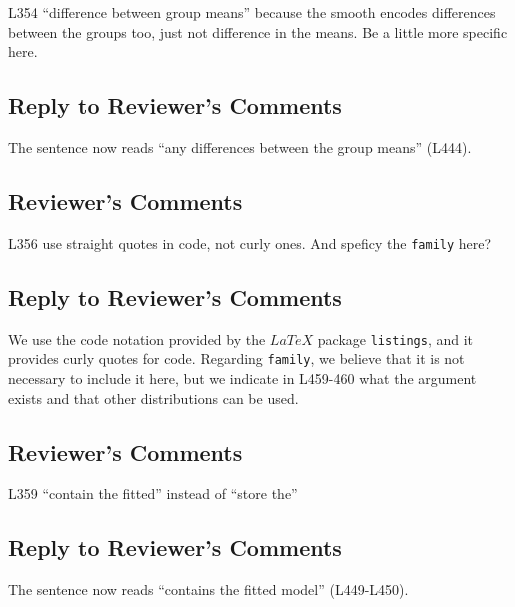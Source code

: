 \documentclass[
]{article}
\newcommand{\passthrough}[1]{#1}
\begin{document}
L354 ``difference between group means'' because the smooth encodes differences between the groups too, just not difference in the means. Be a little more specific here.

\hypertarget{section-26}{%
\subsection{\texorpdfstring{\textcolor{reviewersblue} {Reply to Reviewer's Comments}}{}}\label{section-26}}

The sentence now reads ``any differences between the group means'' (L444).

\hypertarget{reviewers-comments-26}{%
\subsection{Reviewer's Comments}\label{reviewers-comments-26}}

L356 use straight quotes in code, not curly ones. And speficy the \passthrough{\lstinline!family!} here?

\hypertarget{section-27}{%
\subsection{\texorpdfstring{\textcolor{reviewersblue} {Reply to Reviewer's Comments}}{}}\label{section-27}}

We use the code notation provided by the \(LaTeX\) package \passthrough{\lstinline!listings!}, and it provides curly quotes for code. Regarding \passthrough{\lstinline!family!}, we believe that it is not necessary to include it here, but we indicate in L459-460 what the argument exists and that other distributions can be used.

\hypertarget{reviewers-comments-27}{%
\subsection{Reviewer's Comments}\label{reviewers-comments-27}}

L359 ``contain the fitted'' instead of ``store the''

\hypertarget{section-28}{%
\subsection{\texorpdfstring{\textcolor{reviewersblue} {Reply to Reviewer's Comments}}{}}\label{section-28}}

The sentence now reads ``contains the fitted model'' (L449-L450).
\end{document}
